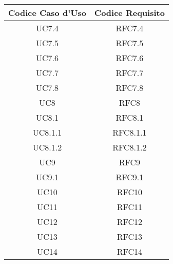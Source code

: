         \begin{table}[!htbp] %
            \centering
            \renewcommand{\arraystretch}{2} %
                \begin{tabular}{|c|c|} %
                \rowcolor{orange!50} %
                \hline
        		\textbf{Codice Caso d'Uso} & \textbf{Codice Requisito} \\
                \hline
                UC7.4 & RFC7.4\\
                \hline
                UC7.5 & RFC7.5\\
                \hline
                UC7.6 & RFC7.6\\
                \hline
                UC7.7 & RFC7.7\\
                \hline
                UC7.8 & RFC7.8\\
                \hline
                UC8 & RFC8\\
                \hline
                UC8.1 & RFC8.1\\
                \hline
                UC8.1.1 & RFC8.1.1\\
                \hline
                UC8.1.2 & RFC8.1.2\\
                \hline
                UC9 & RFC9\\
                \hline
                UC9.1 & RFC9.1\\
                \hline
                UC10 & RFC10\\
                \hline
                UC11 & RFC11\\
                \hline
                UC12 & RFC12\\
                \hline
                UC13 & RFC13\\
                \hline
                UC14 & RFC14\\
                \hline
                \end{tabular}
        \end{table}

